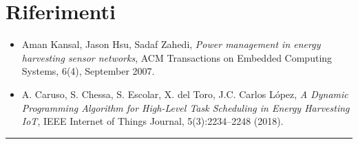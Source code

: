 \documentclass[
  italian,
  openany]{book}
\providecommand{\tightlist}{%
  \setlength{\itemsep}{0pt}\setlength{\parskip}{0pt}}
\begin{document}
\section{Riferimenti}\label{riferimenti}

\begin{itemize}
\tightlist
\item
  Aman Kansal, Jason Hsu, Sadaf Zahedi, \emph{Power management in energy
  harvesting sensor networks}, ACM Transactions on Embedded Computing
  Systems, 6(4), September 2007.
\item
  A. Caruso, S. Chessa, S. Escolar, X. del Toro, J.C. Carlos López,
  \emph{A Dynamic Programming Algorithm for High-Level Task Scheduling
  in Energy Harvesting IoT}, IEEE Internet of Things Journal,
  5(3):2234--2248 (2018).
\end{itemize}

\begin{center}\rule{0.5\linewidth}{0.5pt}\end{center}

\newpage

\backmatter
\end{document}
